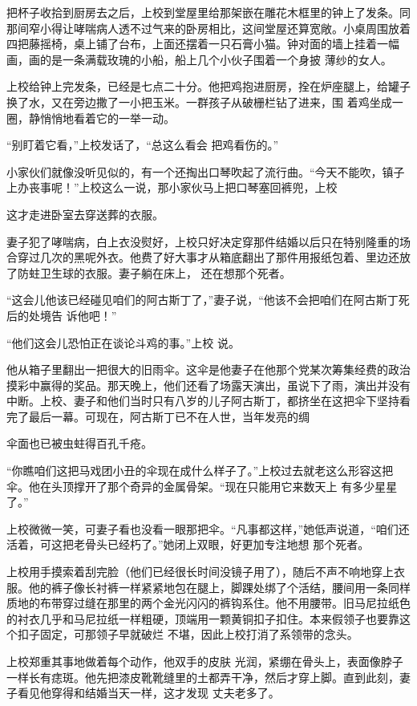 \documentclass{article}
\begin{document}
把杯子收拾到厨房去之后，上校到堂屋里给那架嵌在雕花木框里的钟上了发条。同那间窄小得让哮喘病人透不过气来的卧房相比，这间堂屋还算宽敞。小桌周围放着四把藤摇椅，桌上铺了台布，上面还摆着一只石膏小猫。钟对面的墙上挂着一幅画，画的是一条满载玫瑰的小船，船上几个小伙子围着一个身披
薄纱的女人。 

上校给钟上完发条，已经是七点二十分。他把鸡抱进厨房，拴在炉座腿上，给罐子换了水，又在旁边撒了一小把玉米。一群孩子从破栅栏钻了进来，围
着鸡坐成一圈，静悄悄地看着它的一举一动。 

“别盯着它看，”上校发话了，“总这么看会
把鸡看伤的。” 

小家伙们就像没听见似的，有一个还掏出口琴吹起了流行曲。“今天不能吹，镇子上办丧事呢！”上校这么一说，那小家伙马上把口琴塞回裤兜，上校

\newpage
这才走进卧室去穿送葬的衣服。 

妻子犯了哮喘病，白上衣没熨好，上校只好决定穿那件结婚以后只在特别隆重的场合穿过几次的黑呢外衣。他费了好大事才从箱底翻出了那件用报纸包着、里边还放了防蛀卫生球的衣服。妻子躺在床上，
还在想那个死者。 

“这会儿他该已经碰见咱们的阿古斯丁了，”妻子说，“他该不会把咱们在阿古斯丁死后的处境告
诉他吧！” 

“他们这会儿恐怕正在谈论斗鸡的事。”上校
说。 

他从箱子里翻出一把很大的旧雨伞。这伞是他妻子在他那个党某次筹集经费的政治摸彩中赢得的奖品。那天晚上，他们还看了场露天演出，虽说下了雨，演出并没有中断。上校、妻子和他们当时只有八岁的儿子阿古斯丁，都挤坐在这把伞下坚持看完了最后一幕。可现在，阿古斯丁已不在人世，当年发亮的绸

\newpage
伞面也已被虫蛀得百孔千疮。 

“你瞧咱们这把马戏团小丑的伞现在成什么样子了。”上校过去就老这么形容这把伞。他在头顶撑开了那个奇异的金属骨架。“现在只能用它来数天上
有多少星星了。” 

上校微微一笑，可妻子看也没看一眼那把伞。“凡事都这样，”她低声说道，“咱们还活着，可这把老骨头已经朽了。”她闭上双眼，好更加专注地想
那个死者。 

上校用手摸索着刮完脸（他们已经很长时间没镜子用了），随后不声不响地穿上衣服。他的裤子像长衬裤一样紧紧地包在腿上，脚踝处绑了个活结，腰间用一条同样质地的布带穿过缝在那里的两个金光闪闪的裤钩系住。他不用腰带。旧马尼拉纸色的衬衣几乎和马尼拉纸一样粗硬，顶端用一颗黄铜扣子扣住。本来假领子也要靠这个扣子固定，可那领子早就破烂
不堪，因此上校打消了系领带的念头。 

上校郑重其事地做着每个动作，他双手的皮肤
\newpage
光润，紧绷在骨头上，表面像脖子一样长有痣斑。他先把漆皮靴靴缝里的土都弄干净，然后才穿上脚。直到此刻，妻子看见他穿得和结婚当天一样，这才发现
丈夫老多了。 
\end{document}
